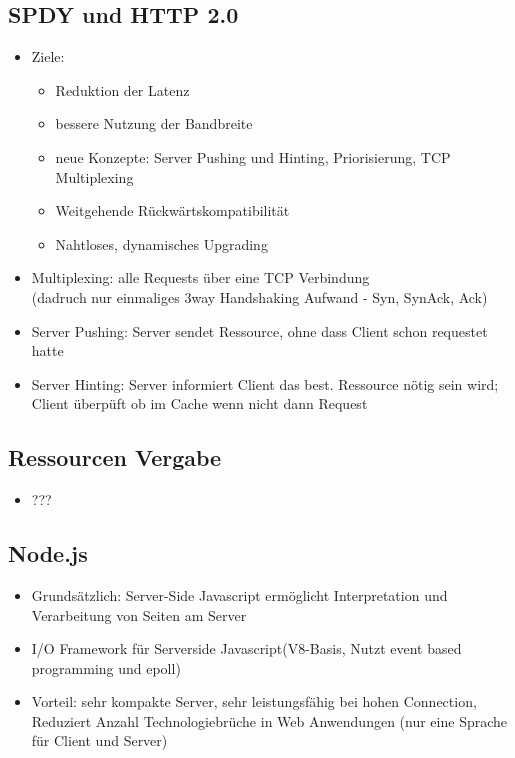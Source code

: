 \documentclass{article} %
\begin{document}
	\subsection{SPDY und HTTP 2.0}
	\begin{itemize}
		\item Ziele:
		\begin{itemize}
			\item Reduktion der Latenz
			\item bessere Nutzung der Bandbreite
			\item neue Konzepte: Server Pushing und Hinting, Priorisierung, TCP Multiplexing
			\item Weitgehende Rückwärtskompatibilität
			\item Nahtloses, dynamisches Upgrading
		\end{itemize}
		\item Multiplexing: alle Requests über eine TCP Verbindung\\ (dadruch nur einmaliges 3way Handshaking Aufwand - Syn, SynAck, Ack)
		\item Server Pushing: Server sendet Ressource, ohne dass Client schon requestet hatte
		\item Server Hinting: Server informiert Client das best. Ressource nötig sein wird; Client überpüft ob im Cache wenn nicht dann Request
	\end{itemize}
	\subsection{Ressourcen Vergabe}
	\begin{itemize}
		\item ???
	\end{itemize}
	\subsection{Node.js}
	\begin{itemize}
	\item Grundsätzlich: Server-Side Javascript ermöglicht Interpretation und Verarbeitung von Seiten am Server
		\item I/O Framework für Serverside Javascript(V8-Basis, Nutzt event based programming und epoll)
		\item Vorteil: sehr kompakte Server, sehr leistungsfähig bei hohen Connection, Reduziert Anzahl Technologiebrüche in Web Anwendungen (nur eine Sprache für Client und Server)
	\end{itemize}
\end{document}
